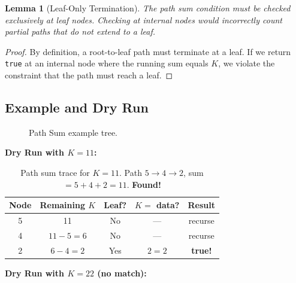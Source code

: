 \documentclass[10pt,journal,compsoc,onecolumn]{IEEEtran}
\newtheorem{lemma}[theorem]{Lemma}
\begin{document}
\begin{lemma}[Leaf-Only Termination]
The path sum condition must be checked exclusively at leaf nodes. Checking at internal nodes would incorrectly count partial paths that do not extend to a leaf.
\end{lemma}

\begin{proof}
By definition, a root-to-leaf path must terminate at a leaf. If we return \texttt{true} at an internal node where the running sum equals $K$, we violate the constraint that the path must reach a leaf.
\end{proof}

\subsection{Example and Dry Run}

\begin{figure}[htbp]
\centering
{}
\caption{Path Sum example tree.}
\end{figure}

\textbf{Dry Run with $K = 11$:}

\begin{table}[htbp]
\centering
\begin{tabular}{|c|c|c|c|c|}
\hline
\textbf{Node} & \textbf{Remaining $K$} & \textbf{Leaf?} & \textbf{$K = $ data?} & \textbf{Result} \\
\hline
5 & 11 & No & --- & recurse \\
4 & $11-5=6$ & No & --- & recurse \\
2 & $6-4=2$ & Yes & $2 = 2$ & \textbf{true!} \\
\hline
\end{tabular}
\caption{Path sum trace for $K=11$. Path $5 \to 4 \to 2$, sum $= 5+4+2 = 11$. \textbf{Found!}}
\end{table}

\textbf{Dry Run with $K = 22$ (no match):}
\end{document}
